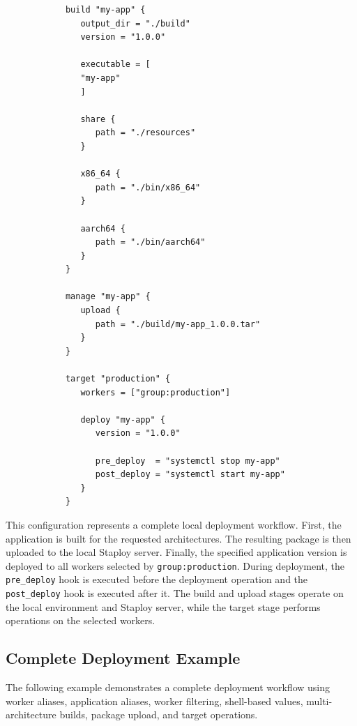 \documentclass[11pt,a4paper]{article}
\begin{document}
    \begin{center}
        \begin{verbatim}
            build "my-app" {
               output_dir = "./build"
               version = "1.0.0"

               executable = [
               "my-app"
               ]

               share {
                  path = "./resources"
               }

               x86_64 {
                  path = "./bin/x86_64"
               }

               aarch64 {
                  path = "./bin/aarch64"
               }
            }

            manage "my-app" {
               upload {
                  path = "./build/my-app_1.0.0.tar"
               }
            }

            target "production" {
               workers = ["group:production"]

               deploy "my-app" {
                  version = "1.0.0"

                  pre_deploy  = "systemctl stop my-app"
                  post_deploy = "systemctl start my-app"
               }
            }
        \end{verbatim}
    \end{center}

    This configuration represents a complete local deployment workflow.
    First, the application is built for the requested architectures.
    The resulting package is then uploaded to the local Staploy server.
    Finally, the specified application version is deployed to all workers selected by \texttt{group:production}.
    During deployment, the \texttt{pre\_deploy} hook is executed before the deployment operation and the \texttt{post\_deploy} hook is executed after it.
    The build and upload stages operate on the local environment and Staploy server, while the target stage performs operations on the selected workers.

    \subsection{Complete Deployment Example}\label{subsec:complete-deployment-example}

    The following example demonstrates a complete deployment workflow using worker aliases, application aliases, worker filtering,
    shell-based values, multi-architecture builds, package upload, and target operations.
\end{document}
